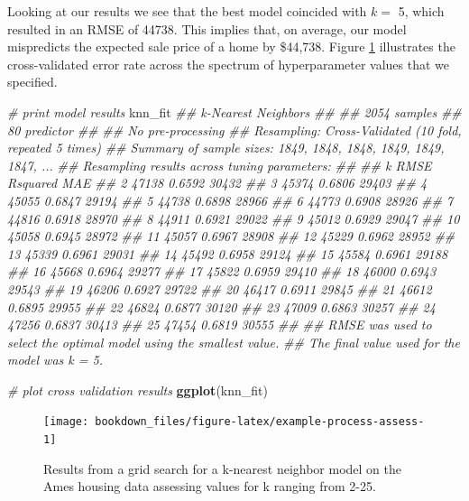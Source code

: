 \documentclass[]{krantz}
\makeatletter
\newenvironment{Shaded}{\begin{snugshade}}{\end{snugshade}}
\newcommand{\CommentTok}[1]{\textcolor[rgb]{0.37,0.37,0.37}{\textit{#1}}}
\newcommand{\KeywordTok}[1]{\textcolor[rgb]{0.27,0.27,0.27}{\textbf{#1}}}
\newcommand{\NormalTok}[1]{#1}
\newenvironment{kframe}{%
\medskip{}
\setlength{\fboxsep}{.8em}
 \def\at@end@of@kframe{}%
 \ifinner\ifhmode%
  \def\at@end@of@kframe{\end{minipage}}%
  \begin{minipage}{\columnwidth}%
 \fi\fi%
 \def\FrameCommand##1{\hskip\@totalleftmargin \hskip-\fboxsep
 \colorbox{shadecolor}{##1}\hskip-\fboxsep
     \hskip-\linewidth \hskip-\@totalleftmargin \hskip\columnwidth}%
 \MakeFramed {\advance\hsize-\width
   \@totalleftmargin\z@ \linewidth\hsize
   \@setminipage}}%
 {\par\unskip\endMakeFramed%
 \at@end@of@kframe}
\renewenvironment{Shaded}{\begin{kframe}}{\end{kframe}}
\makeatother
\begin{document}
Looking at our results we see that the best model coincided with \(k=\) 5, which resulted in an RMSE of 44738. This implies that, on average, our model mispredicts the expected sale price of a home by \$44,738. Figure \ref{fig:example-process-assess} illustrates the cross-validated error rate across the spectrum of hyperparameter values that we specified.

\begin{Shaded}
\begin{Highlighting}[]
\CommentTok{# print model results}
\NormalTok{knn_fit}
\CommentTok{## k-Nearest Neighbors }
\CommentTok{## }
\CommentTok{## 2054 samples}
\CommentTok{##   80 predictor}
\CommentTok{## }
\CommentTok{## No pre-processing}
\CommentTok{## Resampling: Cross-Validated (10 fold, repeated 5 times) }
\CommentTok{## Summary of sample sizes: 1849, 1848, 1848, 1849, 1849, 1847, ... }
\CommentTok{## Resampling results across tuning parameters:}
\CommentTok{## }
\CommentTok{##   k   RMSE   Rsquared  MAE  }
\CommentTok{##    2  47138  0.6592    30432}
\CommentTok{##    3  45374  0.6806    29403}
\CommentTok{##    4  45055  0.6847    29194}
\CommentTok{##    5  44738  0.6898    28966}
\CommentTok{##    6  44773  0.6908    28926}
\CommentTok{##    7  44816  0.6918    28970}
\CommentTok{##    8  44911  0.6921    29022}
\CommentTok{##    9  45012  0.6929    29047}
\CommentTok{##   10  45058  0.6945    28972}
\CommentTok{##   11  45057  0.6967    28908}
\CommentTok{##   12  45229  0.6962    28952}
\CommentTok{##   13  45339  0.6961    29031}
\CommentTok{##   14  45492  0.6958    29124}
\CommentTok{##   15  45584  0.6961    29188}
\CommentTok{##   16  45668  0.6964    29277}
\CommentTok{##   17  45822  0.6959    29410}
\CommentTok{##   18  46000  0.6943    29543}
\CommentTok{##   19  46206  0.6927    29722}
\CommentTok{##   20  46417  0.6911    29845}
\CommentTok{##   21  46612  0.6895    29955}
\CommentTok{##   22  46824  0.6877    30120}
\CommentTok{##   23  47009  0.6863    30257}
\CommentTok{##   24  47256  0.6837    30413}
\CommentTok{##   25  47454  0.6819    30555}
\CommentTok{## }
\CommentTok{## RMSE was used to select the optimal model using the smallest value.}
\CommentTok{## The final value used for the model was k = 5.}

\CommentTok{# plot cross validation results}
\KeywordTok{ggplot}\NormalTok{(knn_fit)}
\end{Highlighting}
\end{Shaded}

\begin{figure}

{\centering \texttt{[image: bookdown\_files/figure-latex/example-process-assess-1]} 

}

\caption{Results from a grid search for a k-nearest neighbor model on the Ames housing data assessing values for k ranging from 2-25.}\label{fig:example-process-assess}
\end{figure}
\end{document}
